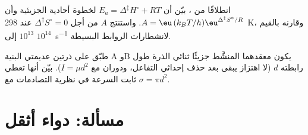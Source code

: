 \begin{exercise}[$\star\star\star$]\label{exo:b3:rate-theories:11}
انطلاقًا من ، بيّن أن $E_a = \Delta^{\ddagger}H^\circ + RT$ لخطوة
أحادية الجزيئية وأن $A = \eu\,(k_BT/h)\eu^{\Delta^{\ddagger}S^\circ/R}$. واستنتج $A$ من أجل $\Delta^{\ddagger}S^\circ = 0$ عند
\qty{298}{K}، وقارنه بالقيم $10^{13}$ إلى $10^{14}$~\unit{s^{-1}} لانشطارات الروابط البسيطة.
\end{exercise}

\begin{exercise}[$\star\star\star$]\label{exo:b3:rate-theories:12}
طبّق  على ذرتين عديمتي البنية A وB يكون معقدهما
المنشَّط جزيئًا ثنائي الذرة طول رابطته $d$ (لا اهتزاز يبقى بعد حذف إحداثي
التفاعل، ودوران مع $I = \mu d^2$). بيّن أنها تعطي
ثابت السرعة في نظرية التصادمات مع $\sigma = \pi d^2$.
\end{exercise}

\section{مسألة: دواء أثقل}

